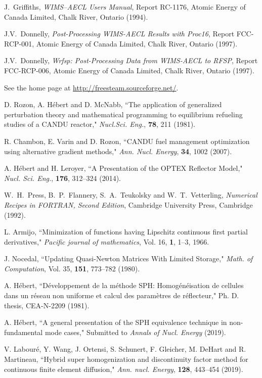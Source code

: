 \begin{thebibliography}{99}
J.~Griffiths,  
\textsl{WIMS--AECL Users Manual},
Report RC-1176, Atomic Energy of Canada Limited, Chalk River, Ontario (1994).

J.V.~Donnelly,  
\textsl{Post-Processing WIMS-AECL Results with Proc16},
Report FCC-RCP-001, Atomic Energy of Canada Limited, Chalk River, Ontario (1997).

J.V.~Donnelly,  
\textsl{Wrfsp: Post-Processing Data from WIMS-AECL to RFSP},
Report FCC-RCP-006, Atomic Energy of Canada Limited, Chalk River, Ontario (1997).

See the home page at \url{http://freesteam.sourceforge.net/}.

D. Rozon, A. H\'ebert and D. McNabb, ``The application of generalized perturbation theory and mathematical programming
to equilibrium refueling studies of a CANDU reactor," {\sl Nucl.Sci. Eng.}, {\bf 78}, 211 (1981).

R. Chambon, E. Varin and D. Rozon, ``CANDU fuel management optimization using alternative gradient
methods," {\sl Ann. Nucl. Energy}, {\bf 34}, 1002 (2007).

A. H\'ebert and H. Leroyer, ``A Presentation of the OPTEX Reflector Model," {\sl Nucl. Sci. Eng.},  {\bf 176}, 312--324 (2014).

W.~H.~Press, B.~P.~Flannery, S.~A.~Teukolsky and W.~T.~Vetterling, {\sl Numerical Recipes in FORTRAN, Second Edition}, Cambridge University Press, Cambridge (1992).

L. Armijo, ``Minimization of functions having Lipschitz continuous
first partial derivatives," {\sl Pacific journal of mathematics}, Vol. 16,
{\bf 1}, 1--3, 1966.

J. Nocedal, ``Updating Quasi-Newton Matrices With Limited Storage," {\sl Math. of Computation}, Vol. 35, {\bf 151}, 773--782 (1980).

A. H\'ebert, ``D\'eveloppement de la m\'ethode SPH: Homog\'en\'eisation de cellules dans un r\'eseau non uniforme et calcul des param\`etres de r\'eflecteur," Ph. D. thesis, CEA-N-2209 (1981).

A. H\'ebert, ``A general presentation of the SPH equivalence technique in non-fundamental mode cases," Submitted to {\sl Annals of Nucl. Energy} (2019).

V. Labour\'e, Y. Wang, J. Ortensi, S. Schunert, F. Gleicher, M. DeHart and R. Martineau, ``Hybrid super homogenization and discontinuity factor method for continuous finite element diffusion," {\sl Ann. nucl. Energy}, {\bf 128}, 443--454 (2019).


\end{thebibliography}
